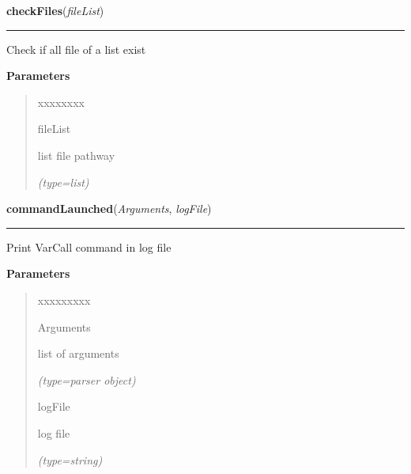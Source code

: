 \hspace{.8\funcindent}\begin{boxedminipage}{\funcwidth}

    \raggedright \textbf{checkFiles}(\textit{fileList})

    \vspace{-1.5ex}

    \rule{\textwidth}{0.5\fboxrule}
\setlength{\parskip}{2ex}
    Check if all file of a list exist

\setlength{\parskip}{1ex}
      \textbf{Parameters}
      \vspace{-1ex}

      \begin{quote}
        \begin{Ventry}{xxxxxxxx}

          \item[fileList]

          list file pathway

            {\it (type=list)}

        \end{Ventry}

      \end{quote}

    \end{boxedminipage}

    \label{script-iVARCall:commandLaunched}

    \vspace{0.5ex}

\hspace{.8\funcindent}\begin{boxedminipage}{\funcwidth}

    \raggedright \textbf{commandLaunched}(\textit{Arguments}, \textit{logFile})

    \vspace{-1.5ex}

    \rule{\textwidth}{0.5\fboxrule}
\setlength{\parskip}{2ex}
    Print VarCall command in log file

\setlength{\parskip}{1ex}
      \textbf{Parameters}
      \vspace{-1ex}

      \begin{quote}
        \begin{Ventry}{xxxxxxxxx}

          \item[Arguments]

          list of arguments

            {\it (type=parser object)}

          \item[logFile]

          log file

            {\it (type=string)}

        \end{Ventry}

      \end{quote}

    \end{boxedminipage}

